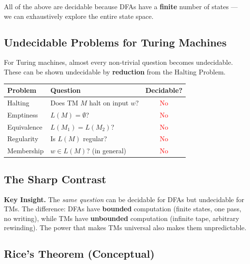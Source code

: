 \documentclass[11pt, a4paper]{article}
\theoremstyle{definition}
\theoremstyle{remark}
\begin{document}
\begin{insightbox}
All of the above are decidable because DFAs have a \textbf{finite} number of states --- we
can exhaustively explore the entire state space.
\end{insightbox}

\subsection{Undecidable Problems for Turing Machines}

For Turing machines, almost every non-trivial question becomes undecidable.  These can be
shown undecidable by \textbf{reduction} from the Halting Problem.

\begin{center}
\begin{tabular}{llc}
  \toprule
  Problem     & Question                         & Decidable? \\
  \midrule
  Halting     & Does TM $M$ halt on input $w$?   & \textcolor{red}{No} \\
  Emptiness   & $L(M)=\emptyset$?                & \textcolor{red}{No} \\
  Equivalence & $L(M_1)=L(M_2)$?                 & \textcolor{red}{No} \\
  Regularity  & Is $L(M)$ regular?               & \textcolor{red}{No} \\
  Membership  & $w\in L(M)$?  (in general)       & \textcolor{red}{No} \\
  \bottomrule
\end{tabular}
\end{center}

\subsection{The Sharp Contrast}

\begin{defbox}
\textbf{Key Insight.}  The \emph{same question} can be decidable for DFAs but undecidable
for TMs.  The difference: DFAs have \textbf{bounded} computation (finite states, one pass, no
writing), while TMs have \textbf{unbounded} computation (infinite tape, arbitrary rewinding).
The power that makes TMs universal also makes them unpredictable.
\end{defbox}

\subsection{Rice's Theorem (Conceptual)}
\end{document}
